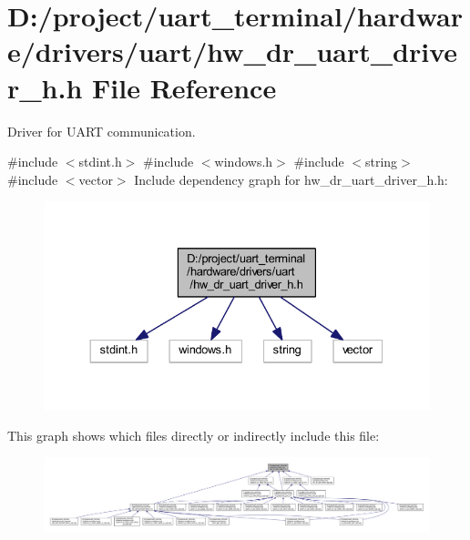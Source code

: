 \section{D\+:/project/uart\+\_\+terminal/hardware/drivers/uart/hw\+\_\+dr\+\_\+uart\+\_\+driver\+\_\+h.h File Reference}
\label{hw__dr__uart__driver__h_8h}


Driver for U\+A\+RT communication.  


{\ttfamily \#include $<$stdint.\+h$>$}\newline
{\ttfamily \#include $<$windows.\+h$>$}\newline
{\ttfamily \#include $<$string$>$}\newline
{\ttfamily \#include $<$vector$>$}\newline
Include dependency graph for hw\+\_\+dr\+\_\+uart\+\_\+driver\+\_\+h.\+h\+:\nopagebreak
\begin{figure}[H]
\begin{center}
\leavevmode
\includegraphics[width=330pt]{hw__dr__uart__driver__h_8h__incl}
\end{center}
\end{figure}
This graph shows which files directly or indirectly include this file\+:\nopagebreak
\begin{figure}[H]
\begin{center}
\leavevmode
\includegraphics[width=350pt]{hw__dr__uart__driver__h_8h__dep__incl}
\end{center}
\end{figure}
